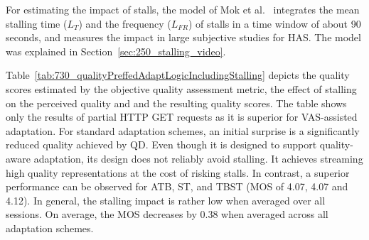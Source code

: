 For estimating the impact of stalls, the model of Mok et al.~\cite{Mok2011} integrates the mean stalling time ($L_T$) and the frequency ($L_{FR}$) of stalls in a time window of about 90 seconds, and measures the impact in large subjective studies for \ac{HAS}.
The model was explained in Section~\ref{sec:250_stalling_video}.

Table~\ref{tab:730_qualityPreffedAdaptLogicIncludingStalling} depicts the quality scores estimated by the objective quality assessment metric, the effect of stalling on the perceived quality and  and the resulting quality scores. 
The table shows only the results of partial \ac{HTTP} GET requests as it is superior for \ac{VAS}-assisted adaptation.
For standard adaptation schemes, an initial surprise is a significantly reduced quality achieved by \ac{QD}. 
Even though it is designed to support quality-aware adaptation, its design does not reliably avoid stalling.
It achieves streaming high quality representations at the cost of risking stalls. 
In contrast, a superior performance can be observed for \ac{ATB}, \ac{ST}, and \ac{TBST} (\ac{MOS} of 4.07, 4.07 and 4.12).
In general, the stalling impact is rather low when averaged over all sessions.
On average, the \ac{MOS} decreases by 0.38 when averaged across all adaptation schemes. 


